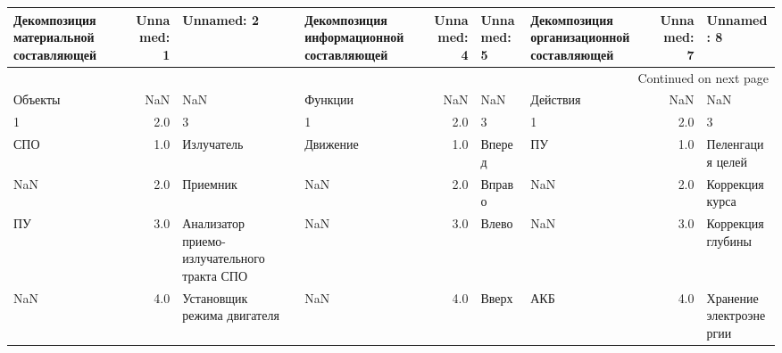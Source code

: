 \begin{longtable}{lrllrllrl}
\label{tbl:model_anpa}\\
\toprule
Декомпозиция материальной составляющей &  Unnamed: 1 &                                   Unnamed: 2 & Декомпозиция информационной составляющей &  Unnamed: 4 &                        Unnamed: 5 & Декомпозиция организационной составляющей &  Unnamed: 7 &                            Unnamed: 8 \\
\midrule
\endhead
\midrule
\multicolumn{9}{r}{{Continued on next page}} \\
\midrule
\endfoot

\bottomrule
\endlastfoot
                               Объекты &         NaN &                                          NaN &                                  Функции &         NaN &                               NaN &                                  Действия &         NaN &                                   NaN \\
                                     1 &         2.0 &                                            3 &                                        1 &         2.0 &                                 3 &                                         1 &         2.0 &                                     3 \\
                                   СПО &         1.0 &                                   Излучатель &                                 Движение &         1.0 &                            Вперед &                                        ПУ &         1.0 &                      Пеленгация целей \\
                                   NaN &         2.0 &                                     Приемник &                                      NaN &         2.0 &                            Вправо &                                       NaN &         2.0 &                       Коррекция курса \\
                                    ПУ &         3.0 &  Анализатор приемо-излучательного тракта СПО &                                      NaN &         3.0 &                             Влево &                                       NaN &         3.0 &                     Коррекция глубины \\
                                   NaN &         4.0 &                  Установщик режима двигателя &                                      NaN &         4.0 &                             Вверх &                                       АКБ &         4.0 &               Хранение электроэнергии \\

\end{longtable}
